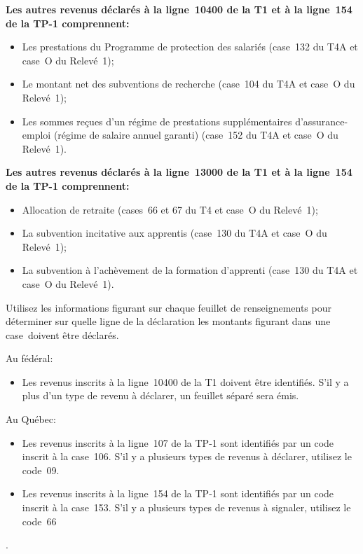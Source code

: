\textbf{Les autres revenus déclarés à la ligne~10400 de la T1 et à la ligne~154 de la TP-1 comprennent:}
\begin{itemize}
	\item Les prestations du Programme de protection des salariés (case~132 du T4A et case~O du Relevé~1);
	\item Le montant net des subventions de recherche (case~104 du T4A et case~O du Relevé~1);
	\item Les sommes reçues d'un régime de prestations supplémentaires d'assurance-emploi (régime de salaire annuel garanti) (case~152 du T4A et case~O du Relevé~1).
\end{itemize}

\textbf{Les autres revenus déclarés à la ligne~13000 de la T1 et à la ligne~154 de la TP-1 comprennent:}

\begin{itemize}
	\item Allocation de retraite (cases~66 et 67 du T4 et case~O du Relevé~1);
	\item La subvention incitative aux apprentis (case~130 du T4A et case~O du Relevé~1);
	\item La subvention à l'achèvement de la formation d'apprenti (case~130 du T4A et case~O du Relevé~1).
\end{itemize}

\begin{rappel}
	Utilisez les informations figurant sur chaque feuillet de renseignements pour déterminer sur quelle ligne de la déclaration les montants figurant dans une case~doivent être déclarés.
	
	Au fédéral:
	\begin{itemize}
		\item Les revenus inscrits à la ligne~10400 de la T1 doivent être identifiés. S'il y a plus d'un type de revenu à déclarer, un feuillet séparé sera émis.
	\end{itemize}
	
	Au Québec:
	\begin{itemize}
		\item Les revenus inscrits à la ligne~107 de la TP-1 sont identifiés par un code inscrit à la case~106. S'il y a plusieurs types de revenus à déclarer, utilisez le code~09.
		\item Les revenus inscrits à la ligne~154 de la TP-1 sont identifiés par un code inscrit à la case~153. S'il y a plusieurs types de revenus à signaler, utilisez le code~66
	\end{itemize}.
\end{rappel}


